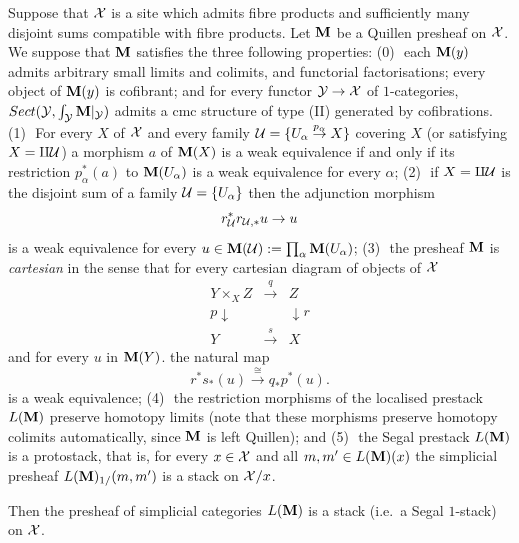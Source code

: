 \begin{theorem}
\label{dansleschamps}
Suppose
that ${\cal X}$ is a site which admits fibre products and sufficiently many
disjoint sums compatible with fibre products.
Let
${\bf M}$ be a Quillen presheaf on ${\cal X}$. We suppose that ${\bf M}$ satisfies the
three following properties: \newline
(0)\,\, each ${\bf M} (y)$ admits arbitrary small limits and colimits,
and functorial factorisations;
every object of ${\bf M} (y)$ is cofibrant; and
for every functor ${\cal Y} \rightarrow {\cal X}$ of $1$-categories,
$Sect ({\cal Y} , \int _{{\cal Y} }{\bf M} |_{{\cal Y}})$ admits a cmc structure of
type (II) generated by cofibrations.
\newline
(1)\,\, For every $X$ of ${\cal X}$ and
every family
${\cal U} =\{ U_{\alpha}\stackrel{p_{\alpha}}{\rightarrow}
X\}$ covering $X$ (or satisfying $X=\amalg {\cal U}$)
a morphism $a$ of ${\bf M} (X)$ is a weak equivalence
if and only if its restriction $p_{\alpha}^{\ast}(a)$ to ${\bf M}
(U_{\alpha})$ is a weak equivalence for every $\alpha$;
\newline
(2)\,\, if $X= \amalg {\cal U}$ is the disjoint sum of a family ${\cal U} =\{
U_{\alpha}\}$ then the adjunction morphism
$$
r_{{\cal U}}^{\ast} r_{{\cal U} , \ast}u\rightarrow u
$$
is a weak equivalence for every $u\in {\bf M} ({\cal U} ):= \prod _{\alpha} {\bf M}
(U_{\alpha})$;
\newline
(3)\,\, the presheaf ${\bf M}$ is {\em cartesian} in the sense that for
every cartesian diagram of objects of ${\cal X}$
$$
\begin{array}{ccc}
Y\times _XZ & \stackrel{q}{\rightarrow} & Z \\
{\scriptstyle p}\downarrow && \downarrow {\scriptstyle r}\\
Y& \stackrel{s}{\rightarrow} & X
\end{array}
$$
and for every $u$ in ${\bf M} (Y)$.
the natural map
$$
r^{\ast} s_{\ast} (u) \stackrel{\cong}{\rightarrow} q_{\ast} p^{\ast}(u).
$$
is a weak
equivalence;
\newline
(4)\,\, the restriction morphisms of the localised prestack $L({\bf M} )$
preserve homotopy limits (note that these morphisms preserve
homotopy colimits automatically, since
${\bf M}$ is left Quillen); and
\newline
(5)\,\, the Segal prestack $L({\bf M} )$ is a protostack, that is, for every
$x\in {\cal X}$ and all $m,m' \in L({\bf M} )(x)$ the simplicial
presheaf $L({\bf M} )_{1/}(m,m')$ is a stack on ${\cal X} / x$.


Then the presheaf of simplicial categories $L({\bf M} )$ is a stack (i.e.\ a
Segal $1$-stack) on ${\cal X}$.
\end{theorem}
